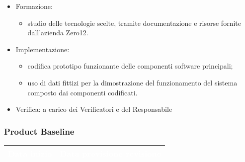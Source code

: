{{\begin{itemize}
            \begin{itemize}
                \item Formazione: 
                    \begin{itemize}
                        \item studio delle tecnologie scelte, tramite documentazione e risorse fornite dall'azienda Zero12.
                    \end{itemize}
                \item Implementazione: 
                    \begin{itemize}
                        \item codifica prototipo funzionante delle componenti software principali;
                        \item uso di dati fittizi per la dimostrazione del funzionamento del sistema composto dai componenti codificati.
                    \end{itemize}
                \item Verifica: a carico dei Verificatori e del Responsabile
            \end{itemize}
    \end{itemize}
    
    \subsubsection{Product Baseline} {
        \setlength{\freewidth}{\dimexpr\textwidth-30\tabcolsep}
        \renewcommand{\arraystretch}{1.0}
        \setlength{\aboverulesep}{0pt}
        \setlength{\belowrulesep}{0pt}
        \begin{longtable}{C{.4\freewidth} C{.4\freewidth}}
        \toprule
        \textcolor{white}{\textbf{Data inizio}}&
        \textcolor{white}{\textbf{Data previsione revisione}} \\
        \toprule
        \endhead
            

\end{longtable}}}}
